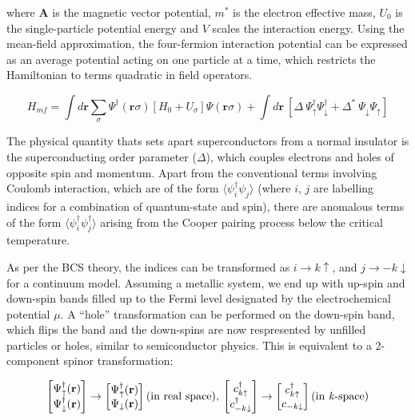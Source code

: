 where $\textbf{A}$ is the magnetic vector potential, $m^{*}$ is the electron effective mass, $U_{0}$ is the single-particle potential energy and $V$ scales the interaction energy. Using the mean-field approximation, the four-fermion interaction potential can be expressed as an average potential acting on one particle at a time, which restricts the Hamiltonian to terms quadratic in field operators.

\begin{equation*}
	H_{mf} = \int d\textbf{r} \sum_{\sigma}\Psi^{\dagger}(\textbf{r}\sigma)[H_{0}+U_{\sigma}]\Psi(\textbf{r}\sigma) + \int d\textbf{r} \: [\Delta \: \Psi^{\dagger}_{\uparrow} \Psi^{\dagger}_{\downarrow} + \Delta^{*} \: \Psi_{\downarrow} \Psi_{\uparrow}]
\end{equation*}

The physical quantity thats sets apart superconductors from a normal insulator is the superconducting order parameter ($\Delta$), which couples electrons and holes of opposite spin and momentum. Apart from the conventional terms involving Coulomb interaction, which are of the form $\langle \psi_{i}^{\dagger}\psi_{j} \rangle$ (where $i$, $j$ are labelling indices for a combination of quantum-state and spin), there are anomalous terms of the form $\langle \psi_{i}^{\dagger}\psi_{j}^{\dagger} \rangle$ arising from the Cooper pairing process below the critical temperature. \par 

As per the BCS theory, the indices can be transformed as $i \rightarrow k \uparrow$, and $j \rightarrow -k \downarrow$ for a continuum model. Assuming a metallic system, we end up with up-spin and down-spin bands filled up to the Fermi level designated by the electrochemical potential $\mu$. A ``hole'' transformation can be performed on the down-spin band, which flips the band and the down-spins are now respresented by unfilled particles or holes, similar to semiconductor physics. This is equivalent to a 2-component spinor transformation:

\begin{equation}
    \begin{bmatrix}
        \Psi^{\dagger}_{\uparrow}(\textbf{r}) \\
        \Psi^{\dagger}_{\downarrow}(\textbf{r})
     \end{bmatrix} \rightarrow
     \begin{bmatrix}
        \Psi^{\dagger}_{\uparrow}(\textbf{r})\\
        \Psi_{\downarrow}(\textbf{r})
     \end{bmatrix} (\text{in real space}), \: 
     \begin{bmatrix}
        c^{\dagger}_{k \uparrow} \\
        c^{\dagger}_{-k \downarrow}    
     \end{bmatrix} \rightarrow
     \begin{bmatrix}
        c^{\dagger}_{k\uparrow} \\
        c_{-k\downarrow}   
     \end{bmatrix} (\text{in \textit{k}-space})
\end{equation}


